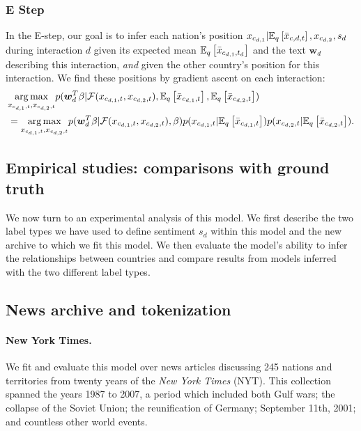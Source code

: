 \subsubsection{E Step} In the E-step, our goal is to infer each
nation's position $x_{c_{d,1}} | \mathbb{E}_q\left[ \bar{x}_{c,d,t} \right],
x_{c_{d,2}}, s_d$ during interaction $d$ given its expected mean $\mathbb{E}_q\left[ \bar
x_{c_{d,1},t_d} \right]$ and the text $\bm w_d$ describing this interaction,
\emph{and} given the other country's position for this interaction.
We find these positions by gradient ascent on each interaction:
\begin{align}
  & \underset{x_{c_{d,1},t}, x_{c_{d,2},t}}
  {\arg \max}
  p(\bm w_d^T \beta | \mathcal{F}(x_{c_{d,1},t}, x_{c_{d,2},t}),
  \mathbb{E}_q\left[ \bar x_{c_{d,1},t} \right], \mathbb{E}_q\left[ \bar x_{c_{d,2},t} \right]) \nonumber \\
  & = \underset{x_{c_{d,1},t}, x_{c_{d,2},t}}
  { \arg \max }
  p(\bm w_d^T \beta | \mathcal{F}(x_{c_{d,1},t}, x_{c_{d,2},t}), \beta)
  p(x_{c_{d,1},t} | \mathbb{E}_q\left[ \bar x_{c_{d,1},t} \right] )
  p(x_{c_{d,2},t} | \mathbb{E}_q\left[ \bar x_{c_{d,2},t} \right] ).
\end{align}

\subsection{Empirical studies: comparisons with ground truth}
We now turn to an experimental analysis of this model.  We first
describe the two label types we have used to define sentiment $s_d$
within this model and the new archive to which we fit this model.  We
then evaluate the model's ability to infer the relationships between
countries and compare results from models inferred with the two
different label types.

\subsection{News archive and tokenization}

\paragraph{New York Times.}
We fit and evaluate this model over news articles discussing 245
nations and territories from twenty years of the \emph{New York Times}
(NYT).  This collection spanned the years 1987 to 2007, a period which
included both Gulf wars; the collapse of the Soviet Union; the
reunification of Germany; September 11th, 2001; and countless other
world events.

